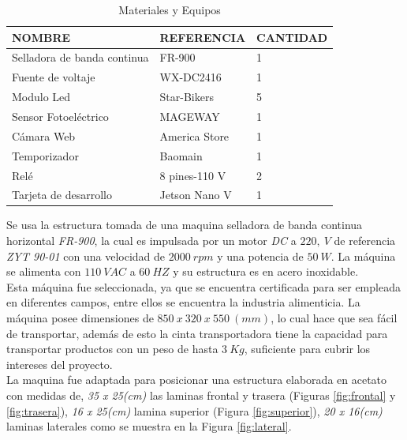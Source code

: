\begin{table}[ht]
	\centering
	\resizebox{10cm}{!} {
	\begin{tabular}{|p{5cm}|p{3.5cm}|p{2.5cm}|}
		\hline
		NOMBRE & REFERENCIA & CANTIDAD \\ 
		\hline
		Selladora de banda continua & FR-900 & 1 \\
		\hline
		Fuente de voltaje & WX-DC2416 & 1 \\
		\hline
		Modulo Led & Star-Bikers & 5 \\
		\hline
		Sensor Fotoeléctrico & MAGEWAY & 1 \\
		\hline
		Cámara Web & America Store & 1 \\
		\hline
		Temporizador & Baomain  & 1 \\
		\hline
		Relé & 8 pines-110 V & 2 \\
		\hline
		Tarjeta de desarrollo & Jetson Nano V & 1 \\
		\hline
	\end{tabular}	
	}
	\caption{Materiales y Equipos}
	\label{table:materiales}
\end{table}	

Se usa la estructura tomada de una maquina selladora de banda continua horizontal \textit{FR-900}, la cual es impulsada por un motor \textit{DC} a $220, \ V$ de referencia \textit{ZYT 90-01} con una velocidad de $2000 \ rpm$ y una potencia de $50 \ W$. La máquina se alimenta con $110 \ VAC$ a $60 \ HZ$ y su estructura es en acero inoxidable.\\

Esta máquina fue seleccionada, ya que se encuentra certificada para ser empleada en diferentes campos, entre ellos se encuentra la industria alimenticia. La máquina posee dimensiones de $850 \ x \ 320 \ x \ 550 \ (mm) $, lo cual hace que sea fácil de transportar, además de esto la cinta transportadora tiene la capacidad para transportar productos con un peso de hasta $3 \ Kg$, suficiente para cubrir los intereses del proyecto.\\

La maquina fue adaptada para posicionar una estructura elaborada en acetato con medidas de, \textit{35 x 25(cm)} las laminas frontal y trasera (Figuras \ref{fig:frontal} y \ref{fig:trasera}), \textit{16 x 25(cm)} lamina superior (Figura \ref{fig:superior}), \textit{20 x 16(cm)} laminas laterales como se muestra en la Figura \ref{fig:lateral}.\\

